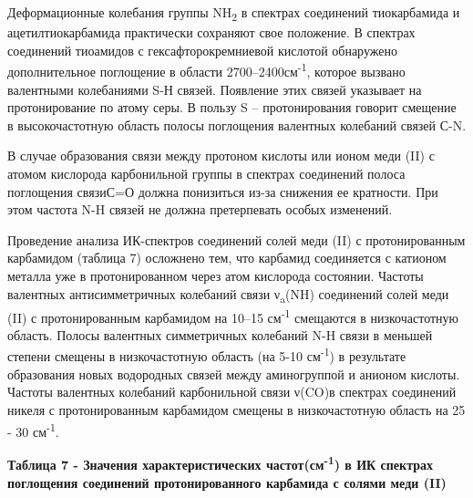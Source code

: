 Деформационные колебания группы NH\textsubscript{2} в спектрах
соединений тиокарбамида и ацетилтиокарбамида практически сохраняют свое
положение. В спектрах соединений тиоамидов с гексафторокремниевой
кислотой обнаружено дополнительное поглощение в области
2700--2400см\textsuperscript{-1}, которое вызвано валентными колебаниями
S-Н связей. Появление этих связей указывает на протонирование по атому
серы. В пользу S -- протонирования говорит смещение в высокочастотную
область полосы поглощения валентных колебаний связей С-N.

В случае образования связи между протоном кислоты или ионом меди (II) с
атомом кислорода карбонильной группы в спектрах соединений полоса
поглощения связиС=О должна понизиться из-за снижения ее кратности. При
этом частота N-H связей не должна претерпевать особых изменений.

Проведение анализа ИК-спектров соединений солей меди (II) с
протонированным карбамидом (таблица 7) осложнено тем, что карбамид
соединяется с катионом металла уже в протонированном через атом
кислорода состоянии. Частоты валентных антисимметричных колебаний связи
ν\textsubscript{a}(NH) соединений солей меди (II) с протонированным
карбамидом на 10--15 см\textsuperscript{-1} смещаются в низкочастотную
область. Полосы валентных симметричных колебаний N-H связи в меньшей
степени смещены в низкочастотную область (на 5-10
см\textsuperscript{-1}) в результате образования новых водородных связей
между аминогруппой и анионом кислоты. Частоты валентных колебаний
карбонильной связи ν(CO)в спектрах соединений никеля с протонированным
карбамидом смещены в низкочастотную область на 25 - 30
см\textsuperscript{-1}.

\textbf{Таблица 7 - Значения характеристических
частот(см\textsuperscript{-1}) в ИК спектрах поглощения соединений
протонированного карбамида с солями меди (II)}

